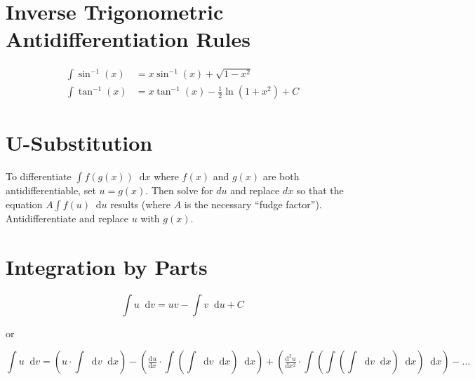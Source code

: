 \documentclass[12pt]{article}
\newcommand*{\asin}{\sin^{-1}}
\newcommand*{\atan}{\tan^{-1}}
\newcommand*{\dd}[3][]{\tfrac{\mathrm{d}^{#1}#2}{\mathrm{d}#3^{#1}}}
\newcommand*{\D}[1]{\mathop{}\!\mathrm{d} #1}
\newenvironment{rmbskip}{\setlength{\belowdisplayskip}{0pt}\ignorespaces}%
  {\ignorespacesafterend}
\newenvironment{rmskip}{\setlength{\abovedisplayskip}{0pt}%
  \setlength{\belowdisplayskip}{0pt}\ignorespaces}%
  {\ignorespacesafterend}
\begin{document}
\section*{Inverse Trigonometric Antidifferentiation Rules}
\begin{rmskip}
  \begin{align*}
    \int \asin(x) &= x\asin(x) + \sqrt{1-x^2}\\
    \int \atan(x) &= x\atan(x) - \frac{1}{2} \ln(1 + x^2) + C
  \end{align*}
\end{rmskip}
\section*{U-Substitution}
To differentiate \(\int f(g(x)) \D{x}\) where \(f(x)\) and \(g(x)\) are both
antidifferentiable, set \(u = g(x)\). Then solve for \(du\) and replace \(dx\)
so that the equation \(A\int f(u) \D{u}\) results (where \(A\) is the necessary
``fudge factor''). Antidifferentiate and replace \(u\) with \(g(x)\).
\section*{Integration by Parts}
\[
  \int u \D{v} = uv - \int v \D{u} + C
\]

or

\begin{rmbskip}
  \[
    \int u \D{v} = \left(u \cdot \int \D{v} \D{x}\right) - \left(
      \dd{u}{x} \cdot \int \left( \int \D{v} \D{x} \right) \D{x}
      \right) + \left(\dd[2]{u}{x} \cdot \int \left( \int \left( \int \D{v}
      \D{x} \right) \D{x} \right) \D{x} \right) - \dots
  \]
\end{rmbskip}
\end{document}
